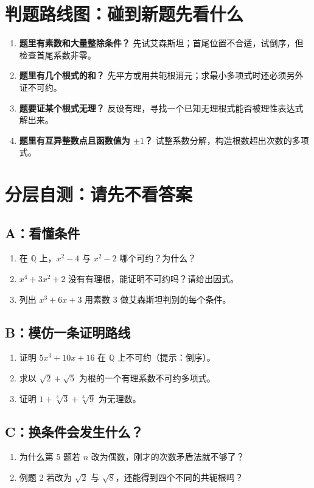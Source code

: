 \documentclass[12pt,a4paper,UTF8,fontset=none]{ctexart}
\begin{document}
\section{判题路线图：碰到新题先看什么}
\begin{enumerate}
\item \textbf{题里有素数和大量整除条件？} 先试艾森斯坦；首尾位置不合适，试倒序，但检查首尾系数非零。
\item \textbf{题里有几个根式的和？} 先平方或用共轭根消元；求最小多项式时还必须另外证不可约。
\item \textbf{题要证某个根式无理？} 反设有理，寻找一个已知无理根式能否被理性表达式解出来。
\item \textbf{题里有互异整数点且函数值为 $\pm1$？} 试整系数分解，构造根数超出次数的多项式。
\end{enumerate}

\section{分层自测：请先不看答案}
\subsection{A：看懂条件}
\begin{enumerate}[label=\textbf{A\arabic*.}]
\item 在 $\mathbb Q$ 上，$x^2-4$ 与 $x^2-2$ 哪个可约？为什么？
\item $x^4+3x^2+2$ 没有有理根，能证明不可约吗？请给出因式。
\item 列出 $x^3+6x+3$ 用素数 $3$ 做艾森斯坦判别的每个条件。
\end{enumerate}
\subsection{B：模仿一条证明路线}
\begin{enumerate}[label=\textbf{B\arabic*.}]
\item 证明 $5x^3+10x+16$ 在 $\mathbb Q$ 上不可约（提示：倒序）。
\item 求以 $\sqrt2+\sqrt5$ 为根的一个有理系数不可约多项式。
\item 证明 $1+\sqrt[3]3+\sqrt[3]9$ 为无理数。
\end{enumerate}
\subsection{C：换条件会发生什么？}
\begin{enumerate}[label=\textbf{C\arabic*.}]
\item 为什么第 5 题若 $n$ 改为偶数，刚才的次数矛盾法就不够了？
\item 例题 2 若改为 $\sqrt2$ 与 $\sqrt8$，还能得到四个不同的共轭根吗？
\end{enumerate}
\end{document}
